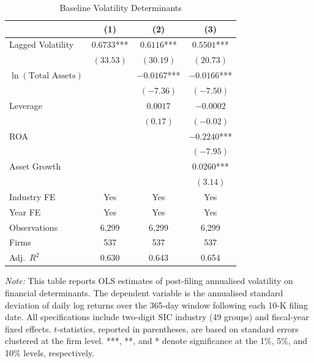 \begin{table}[htbp]
\centering
\caption{Baseline Volatility Determinants}
\label{tab:baseline}
\begin{tabular}{lccc}
\toprule
 & (1) & (2) & (3) \\
\midrule
Lagged Volatility & $0.6733$*** & $0.6116$*** & $0.5501$*** \\
 & $(33.53)$ & $(30.19)$ & $(20.73)$ \\[4pt]
$\ln(\text{Total Assets})$ &  & $-0.0167$*** & $-0.0166$*** \\
 &  & $(-7.36)$ & $(-7.50)$ \\[4pt]
Leverage &  & $0.0017$ & $-0.0002$ \\
 &  & $(0.17)$ & $(-0.02)$ \\[4pt]
ROA &  &  & $-0.2240$*** \\
 &  &  & $(-7.95)$ \\[4pt]
Asset Growth &  &  & $0.0260$*** \\
 &  &  & $(3.14)$ \\[4pt]
\midrule
Industry FE & Yes & Yes & Yes \\
Year FE & Yes & Yes & Yes \\
Observations & 6,299 & 6,299 & 6,299 \\
Firms & 537 & 537 & 537 \\
Adj.\ $R^2$ & 0.630 & 0.643 & 0.654 \\
\bottomrule
\end{tabular}
\begin{tablenotes}
\item \textit{Note:} This table reports OLS estimates of post-filing annualised volatility on financial determinants. The dependent variable is the annualised standard deviation of daily log returns over the 365-day window following each 10-K filing date. All specifications include two-digit SIC industry (49 groups) and fiscal-year fixed effects. $t$-statistics, reported in parentheses, are based on standard errors clustered at the firm level. ***, **, and * denote significance at the 1\%, 5\%, and 10\% levels, respectively.
\end{tablenotes}
\end{table}